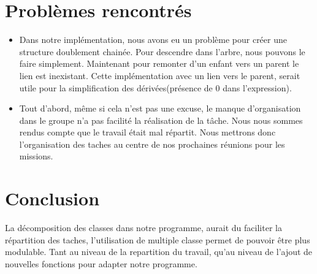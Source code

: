 \documentclass[10pt,a4paper]{article}
\begin{document}
\section*{Problèmes rencontrés}
\begin{itemize}
\item{} Dans notre implémentation, nous avons eu un problème pour créer une structure doublement chainée. Pour descendre dans l'arbre, nous pouvons le faire simplement. Maintenant pour remonter d'un enfant vers un parent le lien est inexistant. Cette implémentation avec un lien vers le parent, serait utile pour la simplification des dérivées(présence de 0 dans l'expression).
\item{}Tout d'abord, même si cela n'est pas une excuse, le manque d'organisation dans le groupe n'a pas facilité la réalisation de la tâche. Nous nous sommes rendus compte que le travail était mal répartit. Nous mettrons donc l'organisation des taches au centre de nos prochaines réunions pour les missions.
\end{itemize}
\section*{Conclusion}
La décomposition des classes dans notre programme, aurait du faciliter la répartition des taches, l'utilisation de multiple classe permet de pouvoir être plus modulable. Tant au niveau de la repartition du travail, qu'au niveau de l'ajout de nouvelles fonctions pour adapter notre programme.
\end{document}
